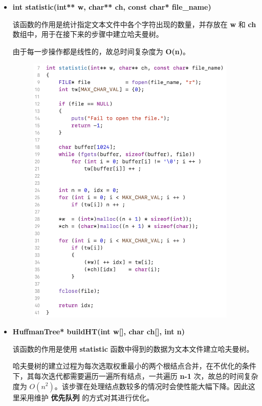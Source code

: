             \begin{itemize}
                \item \textbf{int statistic(int** w, char** ch, const char* file\_name)}
                    \par 该函数的作用是统计指定文本文件中各个字符出现的数量，并存放在 \textbf{w} 和 \textbf{ch} 数组中，用于在接下来的步骤中建立哈夫曼树。
                    \par 由于每一步操作都是线性的，故总时间复杂度为 \textbf{O(n)}。
                    \begin{figure}[htbp]
                        \hspace*{1.2cm}
                        \includegraphics*[width = 10cm]{s1_0.png}
                    \end{figure}
                \item \textbf{HuffmanTree* buildHT(int w[], char ch[], int n)}
                    \par 该函数的作用是使用 \textbf{statistic} 函数中得到的数据为文本文件建立哈夫曼树。
                    \par 哈夫曼树的建立过程为每次选取权重最小的两个根结点合并，在不优化的条件下，其每次迭代都需要遍历一遍所有结点，一共遍历 \textbf{n-1} 次，故总的时间复杂度为 $O(n^2)$。该步骤在处理结点数较多的情况时会使性能大幅下降。因此这里采用维护 \textbf{优先队列} 的方式对其进行优化。

\end{itemize}
